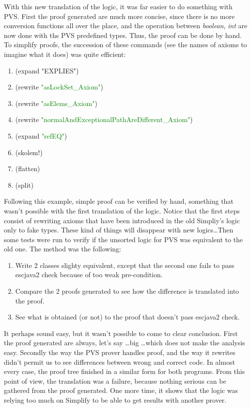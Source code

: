 \documentclass[english,a4paper,10pt]{article}
\begin{document}
With this new translation of the logic, it was far easier to do
something with PVS. First the proof generated are much more concise,
since there is no more conversion functions all over the place, and
the operation between \textit{boolean}, \textit{int} are now done with
ths PVS predefined types. Thus, the proof can be done by hand. To
simplify proofs, the succession of these commands (see the names of
axioms to imagine what it does) was quite efficient:
\begin{enumerate}
\item (expand "EXPLIES")
\item (rewrite \textcolor{green}{"asLockSet\_Axiom"})
\item (rewrite \textcolor{green}{"asElems\_Axiom"})
\item (rewrite \textcolor{green}{"normalAndExceptionalPathAreDifferent\_Axiom"})
\item (expand \textcolor{green}{"refEQ"})
\item (skolem!)
\item (flatten)
\item (split)
\end{enumerate}
Following this example, simple proof can be verified by hand,
something that wasn't possible with the first translation of the
logic. Notice that the first steps consist of rewriting axioms that
have been introduced in the old Simpliy's logic only to fake
types. These kind of things will disappear with new logics\dots Then
some tests were run to verify if the unsorted logic for PVS was
equivalent to the old one. The method was the following:
\begin{enumerate}
\item Write 2 classes slighty equivalent, except that the second one
  fails to pass escjava2 check because of too weak pre-condition.
\item Compare the 2 proofs generated to see how the difference is
  translated into the proof.
\item See what is obtained (or not) to the proof that doesn't pass
  escjava2 check.
\end{enumerate}
It perhaps sound easy, but it wasn't possible to come to clear
conclusion. First the proof generated are always, let's say \dots big
\dots which does not make the analysis easy. Secondly the way the PVS
prover handles proof, and the way it rewrites didn't permit us to see
differences between wrong and correct code. In almost every case, the
proof tree finished in a similar form for both programs. From this
point of view, the translation was a failure, because nothing serious
can be gathered from the proof generated. One more time, it shows that
the logic was relying too much on Simplify to be able to get results
with another prover.\\
\end{document}
